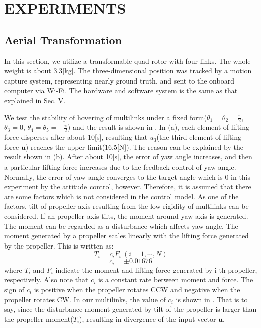 \section{EXPERIMENTS}
\subsection{Aerial Transformation}
In this section, we utilize a transformable quad-rotor with four-links. The whole weight is about 3.3[kg]. The three-dimensional position was tracked by a motion capture system, representing nearly ground truth, and sent to the onboard computer via Wi-Fi. The hardware and software system is the same as that explained in Sec. V. 
\par
We test the stability of hovering of multilinks under a fixed form($\theta_1=\theta_2=\frac{\pi}{2}$, $\theta_3=0$, $\theta_4=\theta_5=-\frac{\pi}{2}$) and the result is shown in . In (a), each element of lifting force disperses after about 10[s], resulting that $u_3$(the third element of lifting force $\bm{u}$) reaches the upper limit(16.5[N]). The reason can be explained by the result shown in (b). After about 10[s], the error of yaw angle increases, and then a particular lifting force increases due to the feedback control of yaw angle. Normally, the error of yaw angle converges to the target angle  which is $0$ in this experiment  by the attitude control, however. Therefore, it is assumed that there are some factors which is not considered in the control model. As one of the factors, tilt of propeller axis resulting from the low rigidity of multilinks can be considered. If an propeller axis tilts, the moment around yaw axis is generated. The moment can be regarded as a disturbance which affects yaw angle. The moment generated by a propeller scales linearly with the lifting force generated by the propeller. This is written as:
\begin{equation}
  T_i=c_iF_i \ (i=1,\cdots,N)
\end{equation}
\begin{equation}
  c_i=\pm 0.01676
  \label{eq:coef_c}
\end{equation}
where $T_i$ and $F_i$ indicate the moment and lifting force generated by i-th propeller, respectively. Also note that $c_i$ is a constant rate between moment and force. The sign of $c_i$ is positive when the propeller rotates CCW and negative when the propeller rotates CW. In our multilinks, the value of $c_i$ is shown in . That is to say, since the disturbance moment generated by tilt of the propeller is larger than the propeller moment($T_i$), resulting in divergence of the input vector $\bm{u}$. 
